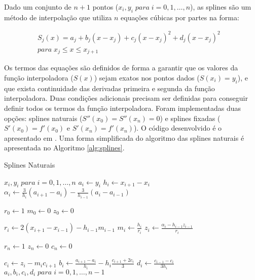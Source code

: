 \documentclass[final,5p]{elsarticle}
\numberwithin{equation}{section}
\begin{document}
        Dado um conjunto de $n+1$ pontos ($x_i,y_i \; para \; i=0,1,\ldots,n$), as splines são um método de interpolação que utiliza $n$ equações cúbicas por partes na forma:
        
        \begin{align*}
            S_j(x) = a_j + b_j (x-x_j) + c_j (x-x_j)^2 + d_j (x-x_j)^2& \\
            para \; x_j \le x \le x_{j+1}&
        \end{align*}
        
        Os termos das equações são definidos de forma a garantir que os valores da função interpoladora ($S(x)$) sejam exatos nos pontos dados ($S(x_i)=y_i$), e que exista continuidade das derivadas primeira e segunda da função interpoladora. Duas condições adicionais precisam ser definidas para conseguir definir todos os termos da função interpoladora. Foram implementadas duas opções: splines naturais ($S''(x_0)=S''(x_n)=0$) e splines  fixadas ($S'(x_0)=f'(x_0)$ e $S'(x_n)=f'(x_n)$). O código desenvolvido é o apresentado em \cite{burden2016analise}. Uma forma simplificada do algoritmo das splines naturais é apresentada no Algoritmo \ref{alg:splines}. 

        \begin{algorithm}
            \caption{Splines Naturais}\label{alg:splines}
            \begin{algorithmic}
                \Require $x_i,y_i \; para \; i=0,1,\ldots,n$
                    \State $a_i \gets y_i$
                \EndFor
                    \State $h_i \gets x_{i+1} - x_i$
                \EndFor
                    \State $\alpha_i \gets \frac{3}{h_i} (a_{i+1}-a_i) - \frac{3}{h_{i-1}} (a_i-a_{i-1})$
                \EndFor
                
                \State $r_0 \gets 1$
                \State $m_0 \gets 0$
                \State $z_0 \gets 0$
                
                    \State $r_i \gets 2 (x_{i+1} - x_{i-1}) - h_{i-1} m_{i-1}$
                    \State $m_i \gets \frac{h_i}{r_i}$
                    \State $z_i \gets \frac{\alpha_i - h_{i-1} z_{i-1}}{r_i}$
                \EndFor
                
                \State $r_n \gets 1$
                \State $z_n \gets 0$
                \State $c_n \gets 0$
                
                    \State $c_i \gets z_i - m_i c_{i+1}$
                    \State $b_i \gets \frac{a_{i+1} - a_i}{h_i} - h_i \frac{c_{i+1} + 2 c_i}{3}$
                    \State $d_i \gets \frac{c_{i-1} - c_i}{3 h_i}$
                \EndFor
                \State \Return $a_i,b_i,c_i,d_i \; para \; i=0,1,\ldots,n-1$
            \end{algorithmic}
        \end{algorithm}
    
\end{document}
